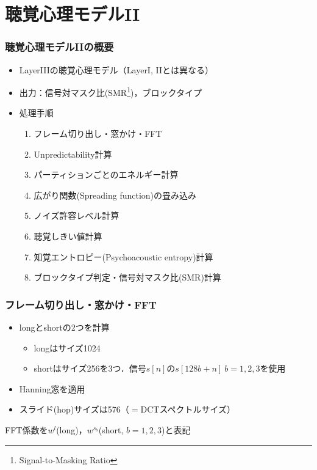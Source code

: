 \documentclass[14pt,xcolor=dvipsnames,table,dvipdfmx]{beamer}
\begin{document}
\section{聴覚心理モデルII}

\begin{frame}[c]
    \frametitle{聴覚心理モデルIIの概要}
    \begin{itemize}
        \item LayerIIIの聴覚心理モデル（LayerI, IIとは異なる）
        \item 出力：信号対マスク比(SMR\footnote{Signal-to-Masking Ratio})，ブロックタイプ
        \item 処理手順
            \begin{enumerate}
                \item フレーム切り出し・窓かけ・FFT
                \item Unpredictability計算
                \item パーティションごとのエネルギー計算
                \item 広がり関数(Spreading function)の畳み込み
                \item ノイズ許容レベル計算
                \item 聴覚しきい値計算
                \item 知覚エントロピー(Psychoacoustic entropy)計算
                \item ブロックタイプ判定・信号対マスク比(SMR)計算
            \end{enumerate}
    \end{itemize}
\end{frame}

\begin{frame}[c]
    \frametitle{フレーム切り出し・窓かけ・FFT}
    \begin{itemize}
        \item longとshortの2つを計算
            \begin{itemize}
                \item longはサイズ1024
                \item shortはサイズ256を3つ．信号$s[n]$の$s[128b + n]\ b = 1,2,3$を使用
            \end{itemize}
        \item Hanning窓を適用
        \item スライド(hop)サイズは576（$=$DCTスペクトルサイズ）
    \end{itemize}
    FFT係数を$w^{l}$(long)，$w^{s_{b}}$(short, $b=1,2,3$)と表記
\end{frame}
\end{document}
